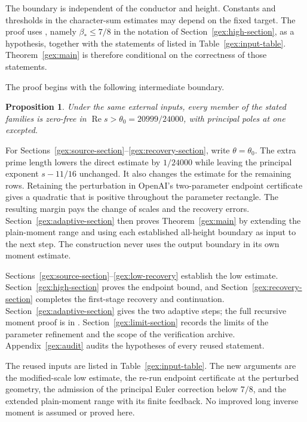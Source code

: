 \documentclass[11pt]{article}
\newtheorem{proposition}[theorem]{Proposition}
\theoremstyle{definition}
\newcommand{\Rea}{\operatorname{Re}}
\begin{document}
The boundary is independent of the conductor and height. Constants
and thresholds in the character-sum estimates may depend on the
fixed target. The proof uses \cite[Theorem~1.1]{OAI26}, namely
$\beta_*\le7/8$ in the notation of Section~\ref{gex:high-section},
as a hypothesis, together with the statements of \cite{OAI26} listed
in Table~\ref{gex:input-table}. Theorem~\ref{gex:main} is therefore
conditional on the correctness of those statements.

The proof begins with the following intermediate boundary.
\begin{proposition}\label{gex:first-stage}
Under the same external inputs, every member of the stated families
is zero-free in $\Rea s>\theta_0=20999/24000$, with principal poles
at one excepted.
\end{proposition}
For Sections~\ref{gex:source-section}--\ref{gex:recovery-section},
write $\theta=\theta_0$. The extra prime length lowers the direct
estimate by $1/24000$
while leaving the principal exponent $s-11/16$ unchanged. It also
changes the estimate for the remaining rows. Retaining the
perturbation in OpenAI's two-parameter endpoint certificate
\cite[Lemma~20.2]{OAI26} gives a quadratic that is positive
throughout the parameter rectangle. The
resulting margin pays the change of scales and the recovery errors.
Section~\ref{gex:adaptive-section} then proves Theorem~\ref{gex:main}
by extending the plain-moment range and using each established
all-height boundary as input to the next step. The construction never
uses the output boundary in its own moment estimate.

Sections~\ref{gex:source-section}--\ref{gex:low-recovery}
establish the low estimate. Section~\ref{gex:high-section} proves
the endpoint bound, and Section~\ref{gex:recovery-section} completes
the first-stage recovery and continuation.
Section~\ref{gex:adaptive-section} gives the two adaptive steps;
the full recursive moment proof is in \cite{GaoAdaptive26}.
Section~\ref{gex:limit-section} records the limits of the parameter
refinement and the scope of the verification archive. Appendix~\ref{gex:audit}
audits the hypotheses of every reused statement.

The reused inputs are listed in Table~\ref{gex:input-table}. The new
arguments are the modified-scale low estimate, the re-run endpoint
certificate at the perturbed geometry, the admission of the
principal Euler correction below $7/8$, and the extended plain-moment
range with its finite feedback. No improved long inverse moment is
assumed or proved here.
\end{document}
